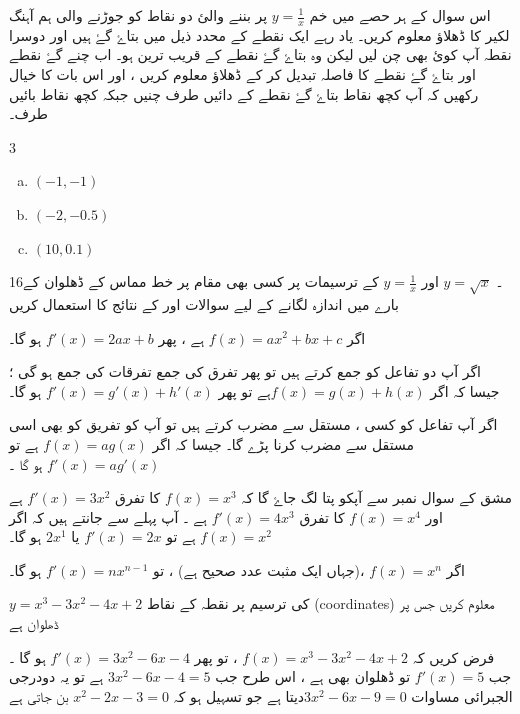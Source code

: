 اس سوال کے ہر حصے میں خم \(y=\frac{1}{x}\) پر بننے والئ دو نقاط کو جوڑنے والی    ہم آہنگ لکیر کا ڈھلاؤ معلوم کریں۔ یاد رہے ایک نقطے کے محدد ذیل میں بتاۓ گۓ ہیں اور دوسرا نقطہ آپ کوئ بھی  چن لیں لیکن وہ بتاۓ گۓ نقطے کے قریب ترین ہو۔ اب چنے گۓ نقطے اور بتاۓ گۓ نقطے کا فاصلہ تبدیل کر کے ڈھلاؤ معلوم کریں ، اور اس بات کا خیال رکھیں کہ آپ کچھ نقاط بتاۓ گۓ نقطے کے دائیں طرف چنیں جبکہ کچھ نقاط بائیں طرف۔
\begin{multicols}{3}     
\begin{enumerate}[a.]
\item   \(   (-1,-1)   \)
\item \(    (-2,-0.5)   \)
\item  \(   (10,0.1)   \)
\end{enumerate}
 \end{multicols}



  16۔ \(y=\sqrt{x}\) اور \(y=\frac{1}{x}\) کے ترسیمات  پر کسی بھی مقام پر خط مماس  کے ڈھلوان کے بارے میں اندازہ لگانے کے لیے سوالات   اور   کے نتائج کا استعمال کریں

 

اگر \(f(x)= ax^2 +bx +c\) ہے ، پھر  \(f'(x) = 2ax +b\) ہو گا۔

اگر آپ دو تفاعل کو  جمع کرتے ہیں تو پھر تفرق کی جمع تفرقات کی جمع ہو گی ؛
جیسا کہ اگر 
\(f(x)=g(x)+h(x)\)ہے تو پھر \(f'(x)= g'(x) +h'(x)\) ہو گا۔

اگر آپ تفاعل کو کسی ، مستقل سے مضرب کرتے ہیں تو آپ کو تفریق کو بھی اسی مستقل سے مضرب کرنا پڑے گا۔  جیسا کہ اگر  \(f(x)= ag(x)\) ہے تو \(f'(x) =ag'(x)\) ہو گا ۔

مشق کے سوال نمبر  سے آپکو پتا لگ جاۓ گا کہ \(f(x) =x^3\) کا تفرق \(f'(x)= 3x^2\) ہے اور \(f(x)=x^4\) کا تفرق \(f'(x) = 4x^3\) ہے ۔ آپ پہلے سے جانتے ہیں کہ اگر \(f(x)=x^2\) ہے تو \(f'(x) = 2x\) یا \(2x^1\) ہو گا۔

اگر \(f(x)=x^n\) ،(جہاں ایک مثبت عدد صحیح ہے) ، تو \(f'(x) = nx^{n-1}\) ہو گا۔

\(y=x^3 -3x^2 -4x +2\) کی ترسیم پر نقطہ کے نقاط (coordinates) معلوم کریں جس پر ڈھلوان  ہے

فرض کریں کہ \(f(x)=x^3 -3x^2 -4x +2 \) ، تو پھر \(f'(x)= 3x^2 -6x -4\)  ہو گا   ۔ جب \(f'(x)=5\) تو ڈھلوان بھی  ہے  ، اس طرح جب 
\(3x^2 -6x -4=5\) ہے تو یہ دودرجی الجبرائی مساوات 
\(3x^2 -6x -9=0\)دیتا ہے جو تسہیل ہو کہ \(x^2 -2x -3=0\) بن جاتی ہے   
 
